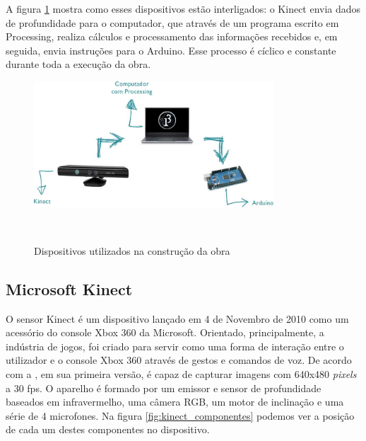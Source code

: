 A figura \ref{fig:dispositivos} mostra como esses dispositivos estão interligados: o Kinect envia dados de profundidade para o computador, que através de um programa escrito em Processing, realiza cálculos e processamento das informações recebidos e, em seguida, envia instruções para o Arduino. Esse processo é cíclico e constante durante toda a execução da obra.

\begin{figure}[H]
  \begin{center}
    \caption{Dispositivos utilizados na construção da obra}
    \vspace*{0,2cm}
    \includegraphics[width=0.8\textwidth]{./04-figuras/dispositivos}
    \label{fig:dispositivos}
  \end{center}
  \vspace*{-0,5cm}
  \\
\end{figure}


\subsection{Microsoft Kinect}

O sensor Kinect é um dispositivo lançado em 4 de Novembro de 2010 como um acessório do console Xbox 360 da Microsoft. Orientado, principalmente, a indústria de jogos, foi criado para servir como uma forma de interação entre o utilizador e o console Xbox 360 através de gestos e comandos de voz. De acordo com a , em sua primeira versão, é capaz de capturar imagens com 640x480 \textit{pixels} a 30 fps. O aparelho é formado por um emissor e sensor de profundidade baseados em infravermelho, uma câmera RGB, um motor de inclinação e uma série de 4 microfones. Na figura \ref{fig:kinect_componentes} podemos ver a posição de cada um destes componentes no dispositivo.

